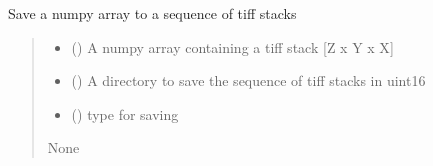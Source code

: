 \documentclass[letterpaper,10pt,english]{sphinxmanual}
\begin{document}
\begin{fulllineitems}
\label{\detokenize{CalSciPy.io:CalSciPy.io.save_tiff_stack}}
\pysigstartsignatures
{}
\pysigstopsignatures
\sphinxAtStartPar
Save a numpy array to a sequence of tiff stacks
\begin{quote}\begin{description}
\begin{itemize}
\item {} 
\sphinxAtStartPar
{} () \sphinxhyphen{}\sphinxhyphen{} A numpy array containing a tiff stack {[}Z x Y x X{]}

\item {} 
\sphinxAtStartPar
{} (\sphinxstyleliteralemphasis{\sphinxupquote{{[}}}\sphinxstyleliteralemphasis{\sphinxupquote{, }}\sphinxstyleliteralemphasis{\sphinxupquote{{]}}}) \sphinxhyphen{}\sphinxhyphen{} A directory to save the sequence of tiff stacks in uint16

\item {} 
\sphinxAtStartPar
{} (\sphinxstyleliteralemphasis{\sphinxupquote{{[}}}\sphinxstyleliteralemphasis{\sphinxupquote{{]}}}) \sphinxhyphen{}\sphinxhyphen{} type for saving

\end{itemize}

\sphinxAtStartPar
None

\end{description}\end{quote}

\end{fulllineitems}

\end{document}
